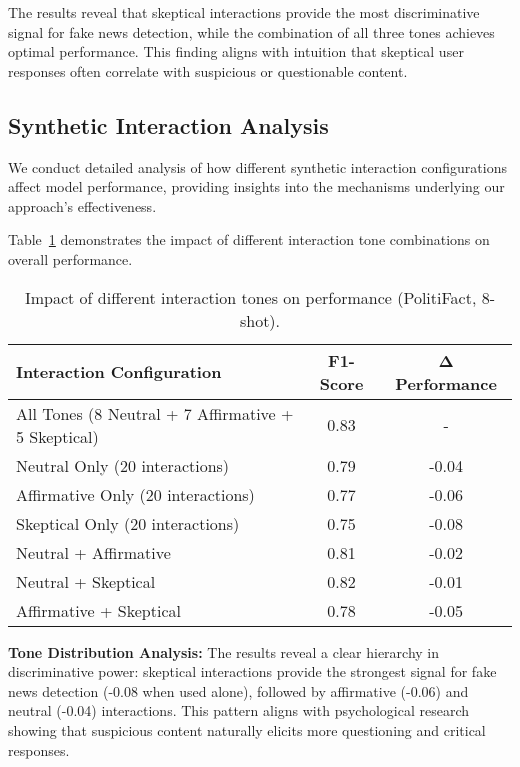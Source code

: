The results reveal that skeptical interactions provide the most discriminative signal for fake news detection, while the combination of all three tones achieves optimal performance. This finding aligns with intuition that skeptical user responses often correlate with suspicious or questionable content.

\subsection{Synthetic Interaction Analysis}

We conduct detailed analysis of how different synthetic interaction configurations affect model performance, providing insights into the mechanisms underlying our approach's effectiveness.

Table~\ref{tab:ablation:tones} demonstrates the impact of different interaction tone combinations on overall performance.

\begin{table}[htbp]
\centering
\caption{Impact of different interaction tones on performance (PolitiFact, 8-shot).}
\label{tab:ablation:tones}
\begin{tabular}{lcc}
\toprule
\textbf{Interaction Configuration} & \textbf{F1-Score} & \textbf{Δ Performance} \\
\midrule
All Tones (8 Neutral + 7 Affirmative + 5 Skeptical) & 0.83 & - \\
\midrule
Neutral Only (20 interactions) & 0.79 & -0.04 \\
Affirmative Only (20 interactions) & 0.77 & -0.06 \\
Skeptical Only (20 interactions) & 0.75 & -0.08 \\
\midrule
Neutral + Affirmative & 0.81 & -0.02 \\
Neutral + Skeptical & 0.82 & -0.01 \\
Affirmative + Skeptical & 0.78 & -0.05 \\
\bottomrule
\end{tabular}
\end{table}

\textbf{Tone Distribution Analysis:} The results reveal a clear hierarchy in discriminative power: skeptical interactions provide the strongest signal for fake news detection (-0.08 when used alone), followed by affirmative (-0.06) and neutral (-0.04) interactions. This pattern aligns with psychological research showing that suspicious content naturally elicits more questioning and critical responses.

